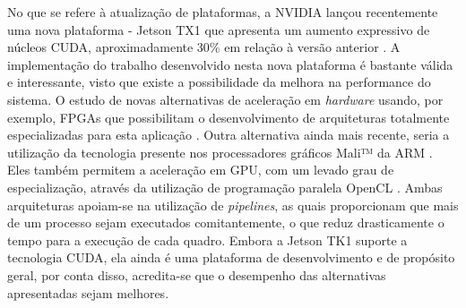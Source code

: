 No que se refere à atualização de plataformas, a NVIDIA lançou recentemente uma nova plataforma - Jetson TX1 que apresenta um aumento expressivo de núcleos CUDA, aproximadamente 30\% em relação à versão anterior \cite{JetsonTX1}. A implementação do trabalho desenvolvido nesta nova plataforma é bastante válida e interessante, visto que existe a possibilidade da melhora na performance do sistema. O estudo de novas alternativas de aceleração em \textit{hardware} usando, por exemplo, FPGAs que possibilitam o desenvolvimento de arquiteturas totalmente especializadas para esta aplicação \cite{Barry2015}. Outra alternativa ainda mais recente, seria a utilização da tecnologia presente nos processadores gráficos Mali™ da ARM \textregistered. Eles também permitem a aceleração em GPU, com um levado grau de especialização, através da utilização de programação paralela OpenCL \cite{StereoARM}. Ambas arquiteturas apoiam-se na utilização de \textit{pipelines}, as quais proporcionam que mais de um processo sejam executados comitantemente, o que reduz drasticamente o tempo para a execução de cada quadro. Embora a Jetson TK1 suporte a tecnologia CUDA, ela ainda é uma plataforma de desenvolvimento e de propósito geral, por conta disso, acredita-se que o desempenho das alternativas apresentadas sejam melhores.




